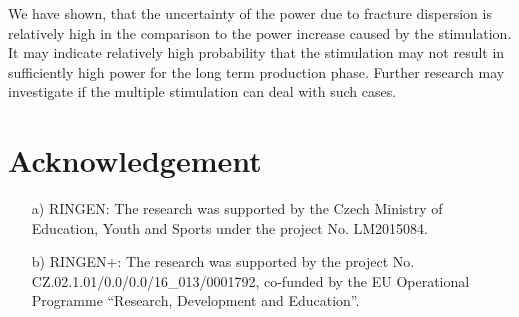 \documentclass{article}
\begin{document}
We have shown, that the uncertainty of the power due to fracture dispersion is relatively high in the comparison to the power increase caused by the stimulation. It may indicate relatively high probability that the stimulation may not result in sufficiently high power for the long term production phase. Further research may investigate if the multiple stimulation can deal with such cases.




\section*{Acknowledgement}
\begin{itemize}
    \item[a)] RINGEN:
    The research was supported by the Czech Ministry of Education, Youth and Sports under the project No. LM2015084.
 
    \item[b)] RINGEN+:
    The research was supported by the project No. CZ.02.1.01/0.0/0.0/16\_013/0001792, co-funded by the EU Operational Programme ``Research, Development and Education''.
\end{itemize}



\end{document}
